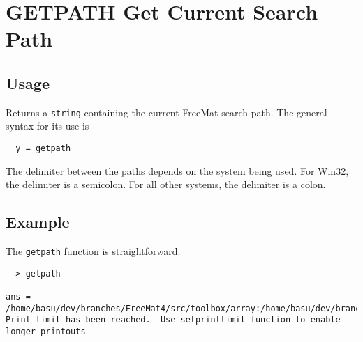 \section{GETPATH Get Current Search Path}

\subsection{Usage}

Returns a \verb|string| containing the current FreeMat search path.  The general syntax for
its use is
\begin{verbatim}
  y = getpath
\end{verbatim}
The delimiter between the paths depends on the system being used.  For Win32, the
delimiter is a semicolon.  For all other systems, the delimiter is a colon.

\subsection{Example}

The \verb|getpath| function is straightforward.
\begin{verbatim}
--> getpath

ans = 
/home/basu/dev/branches/FreeMat4/src/toolbox/array:/home/basu/dev/branches/FreeMat4/src/toolbox:/home/basu/dev/branches/FreeMat4/src/toolbox/binary:/home/basu/dev/branches/FreeMat4/src/toolbox/fitting:/home/basu/dev/branches/FreeMat4/src/toolbox/func:/home/basu/dev/branches/FreeMat4/src/toolbox/funfun:/home/basu/dev/branches/FreeMat4/src/toolbox/general:/home/basu/dev/branches/FreeMat4/src/toolbox/geom:/home/basu/dev/branches/FreeMat4/src/toolbox/graph:/home/basu/dev/branches/FreeMat4/src/toolbox/help:/home/basu/dev/branches/FreeMat4/src/toolbox/io:/home/basu/dev/branches/FreeMat4/src/toolbox/matrix:/home/basu/dev/branches/FreeMat4/src/toolbox/mpi:/home/basu/dev/branches/FreeMat4/src/toolbox/numerical:/home/basu/dev/branches/FreeMat4/src/toolbox/os:/home/basu/dev/branches/FreeMat4/src/toolbox/poly:/home/basu/dev/branches/FreeMat4/src/toolbox/random:/home/basu/dev/branches/FreeMat4/src/toolbox/signal:/home/basu/dev/branches/FreeMat4/src/toolbox/sparse:/home/basu/dev/branches/FreeMat4/sr
Print limit has been reached.  Use setprintlimit function to enable longer printouts
\end{verbatim}
